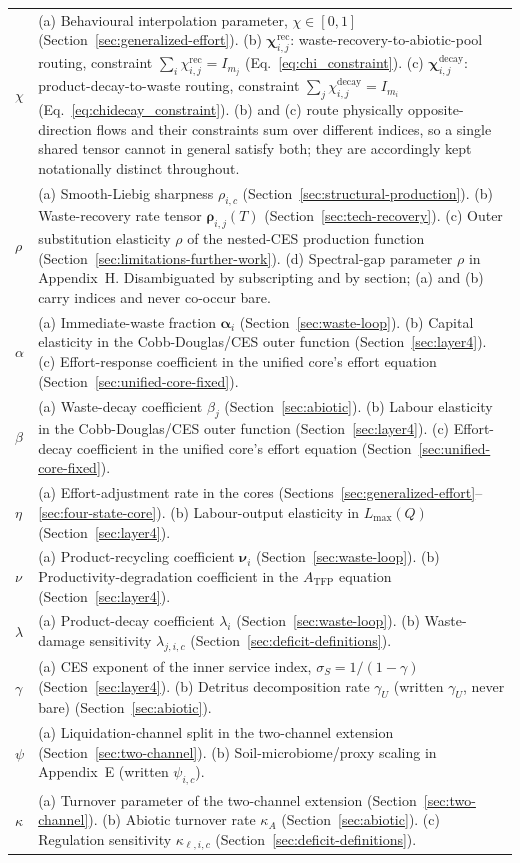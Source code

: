 \documentclass[twocolumn,10pt]{article}
\begin{document}
\begin{table}[h]
\begin{tabular}{lp{5.3cm}}
$\chi$ & (a) Behavioural interpolation parameter, $\chi\in[0,1]$ (Section~\ref{sec:generalized-effort}). (b) $\boldsymbol\chi^{\text{rec}}_{i,j}$: waste-recovery-to-abiotic-pool routing, constraint $\sum_i\chi^{\text{rec}}_{i,j}=I_{m_j}$ (Eq.~\eqref{eq:chi_constraint}). (c) $\boldsymbol\chi^{\text{decay}}_{i,j}$: product-decay-to-waste routing, constraint $\sum_j\chi^{\text{decay}}_{i,j}=I_{m_i}$ (Eq.~\eqref{eq:chidecay_constraint}). (b) and (c) route physically opposite-direction flows and their constraints sum over different indices, so a single shared tensor cannot in general satisfy both; they are accordingly kept notationally distinct throughout. \\ $\rho$ & (a) Smooth-Liebig sharpness $\rho_{i,c}$ (Section~\ref{sec:structural-production}). (b) Waste-recovery rate tensor $\boldsymbol\rho_{i,j}(T)$ (Section~\ref{sec:tech-recovery}). (c) Outer substitution elasticity $\rho$ of the nested-CES production function (Section~\ref{sec:limitations-further-work}). (d) Spectral-gap parameter $\rho$ in Appendix~H. Disambiguated by subscripting and by section; (a) and (b) carry indices and never co-occur bare. \\ $\alpha$ & (a) Immediate-waste fraction $\boldsymbol\alpha_i$ (Section~\ref{sec:waste-loop}). (b) Capital elasticity in the Cobb-Douglas/CES outer function (Section~\ref{sec:layer4}). (c) Effort-response coefficient in the unified core's effort equation (Section~\ref{sec:unified-core-fixed}). \\ $\beta$ & (a) Waste-decay coefficient $\beta_j$ (Section~\ref{sec:abiotic}). (b) Labour elasticity in the Cobb-Douglas/CES outer function (Section~\ref{sec:layer4}). (c) Effort-decay coefficient in the unified core's effort equation (Section~\ref{sec:unified-core-fixed}). \\ $\eta$ & (a) Effort-adjustment rate in the cores (Sections~\ref{sec:generalized-effort}--\ref{sec:four-state-core}). (b) Labour-output elasticity in $L_{\max}(Q)$ (Section~\ref{sec:layer4}). \\ $\nu$ & (a) Product-recycling coefficient $\boldsymbol\nu_i$ (Section~\ref{sec:waste-loop}). (b) Productivity-degradation coefficient in the $A_{\text{TFP}}$ equation (Section~\ref{sec:layer4}). \\ $\lambda$ & (a) Product-decay coefficient $\lambda_i$ (Section~\ref{sec:waste-loop}). (b) Waste-damage sensitivity $\lambda_{j,i,c}$ (Section~\ref{sec:deficit-definitions}). \\ $\gamma$ & (a) CES exponent of the inner service index, $\sigma_S=1/(1-\gamma)$ (Section~\ref{sec:layer4}). (b) Detritus decomposition rate $\gamma_U$ (written $\gamma_U$, never bare) (Section~\ref{sec:abiotic}). \\ $\psi$ & (a) Liquidation-channel split in the two-channel extension (Section~\ref{sec:two-channel}). (b) Soil-microbiome/proxy scaling in Appendix~E (written $\psi_{i,c}$). \\ $\kappa$ & (a) Turnover parameter of the two-channel extension (Section~\ref{sec:two-channel}). (b) Abiotic turnover rate $\kappa_A$ (Section~\ref{sec:abiotic}). (c) Regulation sensitivity $\kappa_{\ell,i,c}$ (Section~\ref{sec:deficit-definitions}). \\

\end{tabular}
\end{table}
\end{document}
